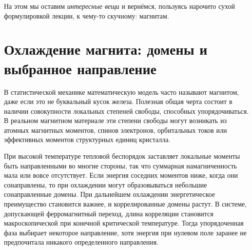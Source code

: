 На этом мы оставим \emph{интересные вещи} и вернёмся, пользуясь нарочито сухой формулировкой лекции, к чему-то скучному: магнитам.

\section{Охлаждение магнита: домены и выбранное направление}

В статистической механике математическую модель часто называют магнитом, даже если это не буквальный кусок железа. Полезная общая черта состоит в наличии совокупности локальных степеней свободы, способных упорядочиваться. В реальном магнитном материале эти степени свободы могут возникать из атомных магнитных моментов, спинов электронов, орбитальных токов или эффективных моментов структурных единиц кристалла.

При высокой температуре тепловой беспорядок заставляет локальные моменты быть направленными во многие стороны, так что суммарная намагниченность мала или вовсе отсутствует. Если энергия соседних моментов ниже, когда они сонаправлены, то при охлаждении могут образовываться небольшие сонаправленные домены. При дальнейшем охлаждении энергетическое преимущество становится важнее, и коррелированные домены растут. В системе, допускающей ферромагнитный переход, длина корреляции становится макроскопической при конечной критической температуре. Тогда упорядоченная фаза выбирает некоторое направление, хотя энергия при нулевом поле заранее не предпочитала никакого определенного направления.

\begin{classroomqa}
\end{classroomqa}

\begin{classroomqa}
\end{classroomqa}

